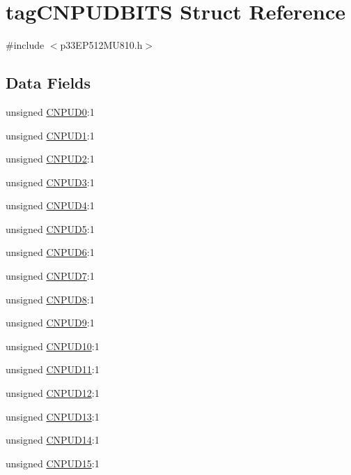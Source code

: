 \hypertarget{structtag_c_n_p_u_d_b_i_t_s}{}\section{tag\+C\+N\+P\+U\+D\+B\+I\+TS Struct Reference}
\label{structtag_c_n_p_u_d_b_i_t_s}


{\ttfamily \#include $<$p33\+E\+P512\+M\+U810.\+h$>$}

\subsection*{Data Fields}
\begin{DoxyCompactItemize}
\item 
unsigned \hyperlink{structtag_c_n_p_u_d_b_i_t_s_acd3b00919c51b92da702b354cc71f50a}{C\+N\+P\+U\+D0}\+:1
\item 
unsigned \hyperlink{structtag_c_n_p_u_d_b_i_t_s_ab2c7348614d94d076550a9e6d6ef5761}{C\+N\+P\+U\+D1}\+:1
\item 
unsigned \hyperlink{structtag_c_n_p_u_d_b_i_t_s_a842a02e1bdf3a4f41cbacea74d9dbd49}{C\+N\+P\+U\+D2}\+:1
\item 
unsigned \hyperlink{structtag_c_n_p_u_d_b_i_t_s_a8538022a32ac123ee7309a31b4c327cb}{C\+N\+P\+U\+D3}\+:1
\item 
unsigned \hyperlink{structtag_c_n_p_u_d_b_i_t_s_a2249b1639630f73c5f231be57e3ff3c4}{C\+N\+P\+U\+D4}\+:1
\item 
unsigned \hyperlink{structtag_c_n_p_u_d_b_i_t_s_a44b3ba5bb128bd3d35186db020a48d75}{C\+N\+P\+U\+D5}\+:1
\item 
unsigned \hyperlink{structtag_c_n_p_u_d_b_i_t_s_ab5918d90eec3dd7c237e0d42fdc3983c}{C\+N\+P\+U\+D6}\+:1
\item 
unsigned \hyperlink{structtag_c_n_p_u_d_b_i_t_s_ac1163995f0be48beeb1ce7818ac313f4}{C\+N\+P\+U\+D7}\+:1
\item 
unsigned \hyperlink{structtag_c_n_p_u_d_b_i_t_s_ae108bb505376e30f03c80b34546b039c}{C\+N\+P\+U\+D8}\+:1
\item 
unsigned \hyperlink{structtag_c_n_p_u_d_b_i_t_s_a4864a5f617124ba0e516125d2cc962e3}{C\+N\+P\+U\+D9}\+:1
\item 
unsigned \hyperlink{structtag_c_n_p_u_d_b_i_t_s_a653ee7cfd52fc6b6f86ca099d4313c11}{C\+N\+P\+U\+D10}\+:1
\item 
unsigned \hyperlink{structtag_c_n_p_u_d_b_i_t_s_ae5947f815633d667a4cac7098329e227}{C\+N\+P\+U\+D11}\+:1
\item 
unsigned \hyperlink{structtag_c_n_p_u_d_b_i_t_s_a8d798d8afdc162dce859989a1a089dd0}{C\+N\+P\+U\+D12}\+:1
\item 
unsigned \hyperlink{structtag_c_n_p_u_d_b_i_t_s_a34ee19a24d3d51e1079afe61495e0b2e}{C\+N\+P\+U\+D13}\+:1
\item 
unsigned \hyperlink{structtag_c_n_p_u_d_b_i_t_s_aba4e7ea9ae22a5e51467ddeb40c42f1f}{C\+N\+P\+U\+D14}\+:1
\item 
unsigned \hyperlink{structtag_c_n_p_u_d_b_i_t_s_a17a0a7bab1aa23c14162d6c4ef013bb7}{C\+N\+P\+U\+D15}\+:1
\end{DoxyCompactItemize}


